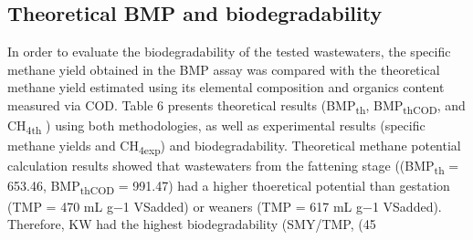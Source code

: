 \subsection{Theoretical BMP and biodegradability}
In order to evaluate the biodegradability of the tested wastewaters, the specific methane yield obtained in the BMP assay was compared with the theoretical methane yield estimated using its elemental composition and organics content measured via COD. Table 6 presents theoretical results (BMP\textsubscript{th}, BMP\textsubscript{thCOD}, and CH\textsubscript{4th} ) using both methodologies, as well as experimental results (specific methane yields and CH\textsubscript{4exp}) and  biodegradability.  Theoretical methane potential calculation results showed that wastewaters from the fattening stage ((BMP\textsubscript{th} = 653.46, BMP\textsubscript{thCOD} = 991.47) had a higher thoeretical potential than gestation (TMP = 470 mL g−1 VSadded) or weaners (TMP = 617 mL g−1 VSadded). Therefore, KW had the highest biodegradability (SMY/TMP, %
(45%
